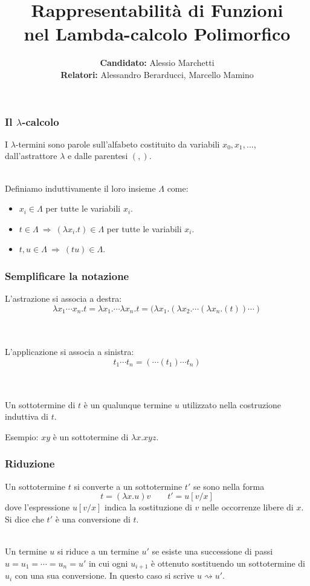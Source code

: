 \documentclass[aspectratio=43]{beamer}
\title[Lambda-calcolo Polimorfico]{Rappresentabilit\`a di Funzioni \\nel Lambda-calcolo
    Polimorfico}
\author[Alessio Marchetti]{\textbf{Candidato:} Alessio Marchetti \\ \textbf{Relatori:} Alessandro
Berarducci, Marcello Mamino}
\date{}
\newcommand{\conv}{\rightsquigarrow}
\begin{document}
\frame{\titlepage}

\begin{frame}
    \frametitle{Il $\lambda$-calcolo} I $\lambda$-termini sono parole
    sull'alfabeto costituito da variabili $x_0, x_1, \dots$, dall'astrattore
    $\lambda$ e dalle parentesi $(,)$. 
\\~\

    Definiamo induttivamente il loro insieme $\Lambda$ come:
    \begin{itemize}
        \item $x_i \in \Lambda$ per tutte le variabili $x_i$.
        \item $t\in \Lambda\ \Rightarrow\ (\lambda x_i.t)\in\Lambda$ per tutte
            le variabili $x_i$.
        \item $t,u\in \Lambda\ \Rightarrow\ (tu)\in \Lambda$.
    \end{itemize}
\end{frame}

\begin{frame}
    \frametitle{Semplificare la notazione}
    L'astrazione si associa a destra:
    \[
        \lambda x_1\cdots x_n.t = \lambda x_1. \cdots \lambda x_n.t = (\lambda
        x_1.(\lambda x_2.\cdots (\lambda x_n.(t))\cdots)
    \]
    \\~\

    L'applicazione si associa a sinistra:
    \[
        t_1\cdots t_n = (\cdots(t_1)\cdots t_n) 
    \]
    \\~\
    
    Un sottotermine di $t$ \`e un qualunque termine $u$ utilizzato nella
    costruzione induttiva di $t$. 

    Esempio: $xy$ \`e un sottotermine di $\lambda x. xyz$.
\end{frame}

\begin{frame}
    \frametitle{Riduzione}
    Un sottotermine $t$ si converte a un sottotermine $t'$ se sono nella forma
    \[
        t = (\lambda x. u)v \qquad t' = u[v/x]
    \]
    dove l'espressione $u[v/x]$ indica la sostituzione di $v$ nelle occorrenze
    libere di
    $x$. Si dice che $t'$ \`e una conversione di $t$.
    \\~\

    Un termine $u$ si riduce a un termine $u'$ se esiste una successione di
    passi $u = u_1 = \cdots = u_n = u'$ in cui ogni $u_{i+1}$ \`e ottenuto
    sostituendo un sottotermine di $u_i$ con una sua conversione. In questo caso
    si scrive $u \conv u'$.
\end{frame}
\end{document}
